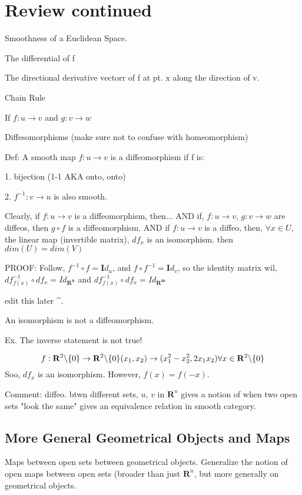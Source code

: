 \documentclass[12pt,letterpaper]{article}
\begin{document}
\section*{Review continued}

Smoothness of a Euclidean Space.

The differential of f

The directional derivative vectorr of f at pt. x along the direction of v.

Chain Rule

If $f: u \rightarrow v$ and $g: v \rightarrow w$

Diffesomorphisms (make sure not to confuse with homeomorphism)

Def: A smooth map $f: u \rightarrow v$ is a diffeomorphism if f is:

1. bijection (1-1 AKA onto, onto)

2. $f^{-1} : v \rightarrow u$ is also smooth.

Clearly, if $f: u \rightarrow v$ is a diffeomorphism, then... AND if, $f: u \rightarrow v$, $g: v \rightarrow w$ are diffeos, then $g \circ f$ is a diffeomorphism. AND if $f: u \rightarrow v$ is a diffeo, then, $\forall x \in U$, the linear map (invertible matrix), $df_x$ is an isomorphism. then $dim(U) = dim(V)$

PROOF: Follow, $f^{-1} \circ f = \mathbf{I}d_u$, and $f \circ f^{-1} = \mathbf{I}d_v$, so the identity matrix wil, $df^{-1}_{f(x)} \circ df_x = I d_{\mathbf{R^n}}$ and $df^{-1}_{f(x)} \circ df_x = I d_{\mathbf{R^m}}$

edit this later ^.

An isomorphism is not a diffeomorphism. 

Ex. The inverse statement is not true! 

\begin{equation}
    f: \mathbf{R}^2 \backslash \{0\} \rightarrow \mathbf{R}^2 \backslash \{0\} \\
    (x_1, x_2) \rightarrow (x_1^2 -x_2^2, 2x_1x_2) \\
    \forall x \in \mathbf{R}^2 \backslash \{0\}
    
\end{equation}
Soo, $df_x$ is an isomorphism. However, $f(x) = f(-x)$.

Comment: diffeo. btwn different sets, $u$, $v$ in $\mathbf{R}^n$ gives a notion of when two open sets "look the same" gives an equivalence relation in smooth category. 

\subsection{More General Geometrical Objects and Maps}
Maps between open sets between geometrical objects. Generalize the notion of open maps between open sets (broader than just $\mathbf{R}^n$, but more generally on geometrical objects. 
\end{document}
